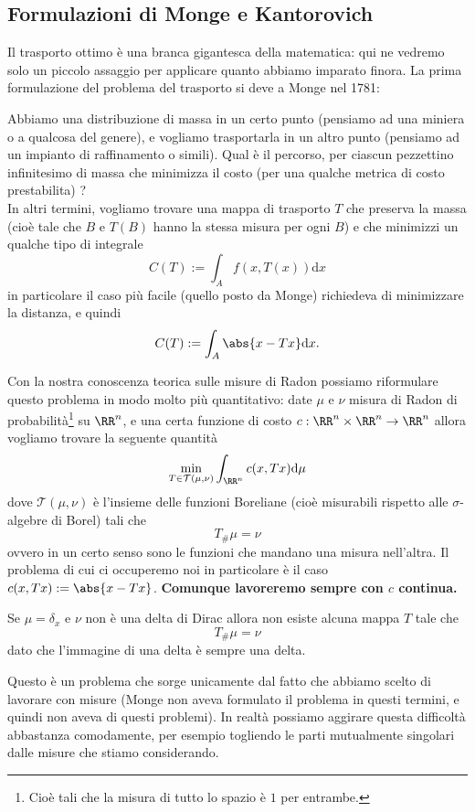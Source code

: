 \documentclass[11pt]{scrartcl}
\newcommand{\dif}{\text{d}}
\begin{document}
	\subsection{Formulazioni di Monge e Kantorovich}
	
	Il trasporto ottimo è una branca gigantesca della matematica: qui ne vedremo solo un piccolo assaggio per applicare quanto abbiamo imparato finora. La prima formulazione del problema del trasporto si deve a Monge nel 1781:
	\begin{problem}
		Abbiamo una distribuzione di massa in un certo punto (pensiamo ad una miniera o a qualcosa del genere), e vogliamo trasportarla in un altro punto (pensiamo ad un impianto di raffinamento o simili). Qual è il percorso, per ciascun pezzettino infinitesimo di massa che minimizza il costo (per una qualche metrica di costo prestabilita) ? \\
		In altri termini, vogliamo trovare una mappa di trasporto $T$ che preserva la massa (cioè tale che $B$ e $T(B)$ hanno la stessa misura per ogni $B$) e che minimizzi un qualche tipo di integrale
		$$C(T):=\int_Af(x,T(x))\dif x$$
		in particolare il caso più facile (quello posto da Monge) richiedeva di minimizzare la distanza, e quindi 
		$$C(T):=\int_A \abs{x-Tx}\dif x.$$
	\end{problem}
	Con la nostra conoscenza teorica sulle misure di Radon possiamo riformulare questo problema in modo molto più quantitativo: date $\mu$ e $\nu$ misura di Radon di probabilità\footnote{Cioè tali che la misura di tutto lo spazio è $1$ per entrambe.} su $\RR^n$, e una certa funzione di costo $c:\RR^n\times \RR^n\to\RR^n$ allora vogliamo trovare la seguente quantità
	$$\min_{T\in \mathcal{T(\mu,\nu)}}\int_{\RR^n}c(x,Tx)\dif \mu$$
	dove $\mathcal{T}(\mu,\nu)$ è l'insieme delle funzioni Boreliane (cioè misurabili rispetto alle $\sigma$-algebre di Borel) tali che
	$$T_\#\mu=\nu$$
	ovvero in un certo senso sono le funzioni che mandano una misura nell'altra. Il problema di cui ci occuperemo noi in particolare è il caso $c(x,Tx):=\abs{x-Tx}$. \textbf{Comunque lavoreremo sempre con $c$ continua.}
	\begin{example}
		Se $\mu=\delta_x$ e $\nu$ non è una delta di Dirac allora non esiste alcuna mappa $T$ tale che
		$$T_\#\mu = \nu$$
		dato che l'immagine di una delta è sempre una delta.
	\end{example}
	Questo è un problema che sorge unicamente dal fatto che abbiamo scelto di lavorare con misure (Monge non aveva formulato il problema in questi termini, e quindi non aveva di questi problemi). In realtà possiamo aggirare questa difficoltà abbastanza comodamente, per esempio togliendo le parti mutualmente singolari dalle misure che stiamo considerando.
\end{document}

